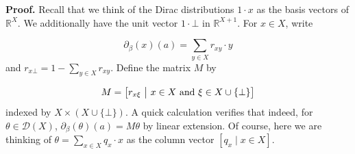 \documentclass[11pt,a4paper]{amsart}
\begin{document}
\hypertarget{html:S7.SS0.SSS0.P0.SPx5}{} \par\noindent\textbf{Proof.}\quad  %
\hypertarget{html:S7.SS0.SSS0.P0.SPx5.p1}{} Recall that we think of the Dirac distributions %
\hypertarget{html:S7.SS0.SSS0.P0.SPx5.p1.m1}{}\({1\cdot x}\) as the basis vectors of %
\hypertarget{html:S7.SS0.SSS0.P0.SPx5.p1.m2}{}\({\mathbb{R}^{X}}\). We additionally have the unit vector %
\hypertarget{html:S7.SS0.SSS0.P0.SPx5.p1.m3}{}\({1\cdot\bot}\) in %
\hypertarget{html:S7.SS0.SSS0.P0.SPx5.p1.m4}{}\({\mathbb{R}^{X+1}}\). For %
\hypertarget{html:S7.SS0.SSS0.P0.SPx5.p1.m5}{}\({x\in X}\), write
\par\medskip
\hypertarget{html:S7.Ex4}{}   %
\hypertarget{html:S7.Ex4.m1}{}\[\partial_{\beta}(x)(a)=\sum_{y\in X}r_{xy}\cdot y\]    and %
\hypertarget{html:S7.SS0.SSS0.P0.SPx5.p1.m6}{}\({r_{x\bot}=1-\sum_{y\in X}r_{xy}}\). Define the matrix %
\hypertarget{html:S7.SS0.SSS0.P0.SPx5.p1.m7}{}\({M}\) by
\par\medskip
\hypertarget{html:S7.Ex5}{}   %
\hypertarget{html:S7.Ex5.m1}{}\[M=\begin{bmatrix}r_{x\xi}\leavevmode\nobreak\ \big{|}\leavevmode\nobreak\ x\in
X\text{ and }\xi\in X\cup\{\bot\}\end{bmatrix}\]    indexed by %
\hypertarget{html:S7.SS0.SSS0.P0.SPx5.p1.m8}{}\({X\times(X\cup\{\bot\})}\). A quick calculation verifies that indeed, for %
\hypertarget{html:S7.SS0.SSS0.P0.SPx5.p1.m9}{}\({\theta\in{\mathcal{D}}(X)}\), %
\hypertarget{html:S7.SS0.SSS0.P0.SPx5.p1.m10}{}\({\partial_{\beta}(\theta)(a)=M\theta}\) by linear extension. Of course, here we are thinking of %
\hypertarget{html:S7.SS0.SSS0.P0.SPx5.p1.m11}{}\({\theta=\sum_{x\in X}q_{x}\cdot x}\) as the column vector %
\hypertarget{html:S7.SS0.SSS0.P0.SPx5.p1.m12}{}\({[q_{x}\mid x\in X]}\).
\par\medskip
\end{document}
